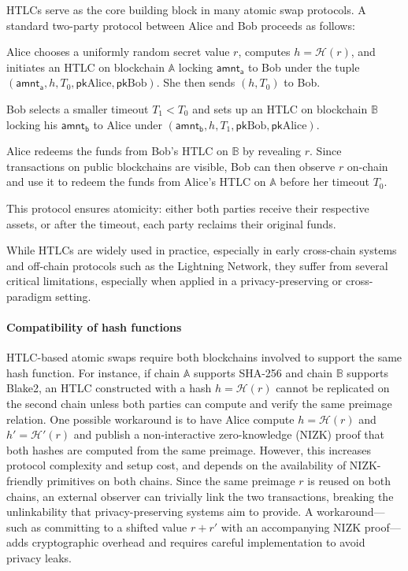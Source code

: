 HTLCs serve as the core building block in many atomic swap protocols. A standard two-party protocol between Alice and Bob proceeds as follows:

Alice chooses a uniformly random secret value $r$, computes $h = \mathcal{H}(r)$, and initiates an HTLC on blockchain $\mathbb{A}$ locking $\mathsf{amnt_a}$ to Bob under the tuple $(\mathsf{amnt_a}, h, T_0, \mathsf{pk}\text{Alice}, \mathsf{pk}\text{Bob})$. She then sends $(h, T_0)$ to Bob.

Bob selects a smaller timeout $T_1 < T_0$ and sets up an HTLC on blockchain $\mathbb{B}$ locking his $\mathsf{amnt_b}$ to Alice under $(\mathsf{amnt_b}, h, T_1, \mathsf{pk}\text{Bob}, \mathsf{pk}\text{Alice})$.

Alice redeems the funds from Bob’s HTLC on $\mathbb{B}$ by revealing $r$. Since transactions on public blockchains are visible, Bob can then observe $r$ on-chain and use it to redeem the funds from Alice’s HTLC on $\mathbb{A}$ before her timeout $T_0$.

This protocol ensures atomicity: either both parties receive their respective assets, or after the timeout, each party reclaims their original funds.

While HTLCs are widely used in practice, especially in early cross-chain systems and off-chain protocols such as the Lightning Network, they suffer from several critical limitations, especially when applied in a privacy-preserving or cross-paradigm setting.

\paragraph*{Compatibility of hash functions}
HTLC-based atomic swaps require both blockchains involved to support the same hash function. For instance, if chain $\mathbb{A}$ supports SHA-256 and chain $\mathbb{B}$ supports Blake2, an HTLC constructed with a hash $h = \mathcal{H}(r)$ cannot be replicated on the second chain unless both parties can compute and verify the same preimage relation. One possible workaround is to have Alice compute $h = \mathcal{H}(r)$ and $h' = \mathcal{H}'(r)$ and publish a non-interactive zero-knowledge (NIZK) proof that both hashes are computed from the same preimage. However, this increases protocol complexity and setup cost, and depends on the availability of NIZK-friendly primitives on both chains.
Since the same preimage $r$ is reused on both chains, an external observer can trivially link the two transactions, breaking the unlinkability that privacy-preserving systems aim to provide. A workaround—such as committing to a shifted value $r + r'$ with an accompanying NIZK proof—adds cryptographic overhead and requires careful implementation to avoid privacy leaks.
